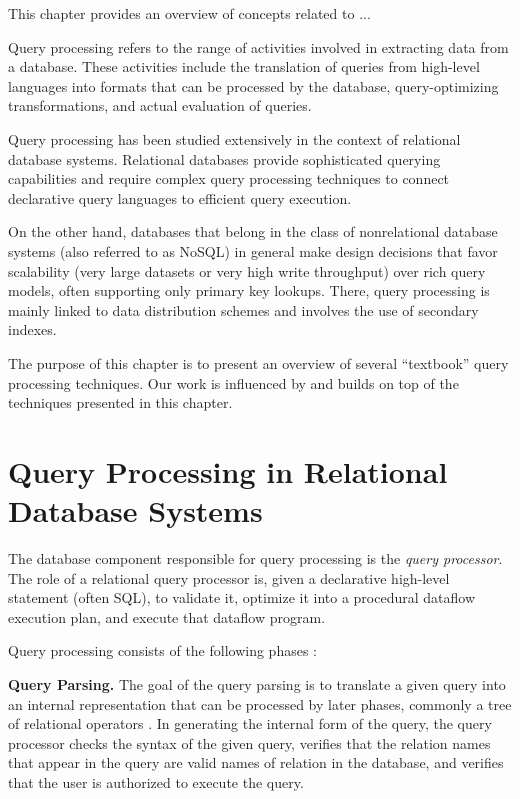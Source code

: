 
This chapter provides an overview of concepts related to ...

Query processing refers to the range of activities involved in extracting data from a database.
These activities include the translation of queries from high-level languages into formats that can be processed
by the database, query-optimizing transformations, and actual evaluation of queries.

Query processing has been studied extensively in the context of relational database systems.
Relational databases provide sophisticated querying capabilities and require complex query processing techniques
to connect declarative query languages to efficient query execution.

On the other hand, databases that belong in the class of nonrelational database systems (also referred to as NoSQL)
in general make design decisions that favor scalability (very large datasets or very high write throughput) over rich
query models, often supporting only primary key lookups.
There, query processing is mainly linked to data distribution schemes and involves the use of secondary indexes.

The purpose of this chapter is to present an overview of several ``textbook'' query processing techniques.
Our work is influenced by and builds on top of the techniques presented in this chapter.

\section{Query Processing in Relational Database Systems}

The database component responsible for query processing is the \textit{query processor}.
The role of a relational query processor is, given a declarative high-level statement (often SQL), to validate it,
optimize it into a procedural dataflow execution plan, and execute that dataflow program.

Query processing consists of the following phases \cite{hellerstein:databasearchitecture, kossmann:distqeuryprocessing}:

\bigskip
\noindent
\textbf{Query Parsing.}
The goal of the query parsing is to translate a given query into an internal representation that can
be processed by later phases, commonly a tree of relational operators \cite{silberschatz:dbbook}.
In generating the internal form of the query,
the query processor checks the syntax of the given query,
verifies that the relation names that appear in the query are valid names of relation in the database,
and verifies that the user is authorized to execute the query.

